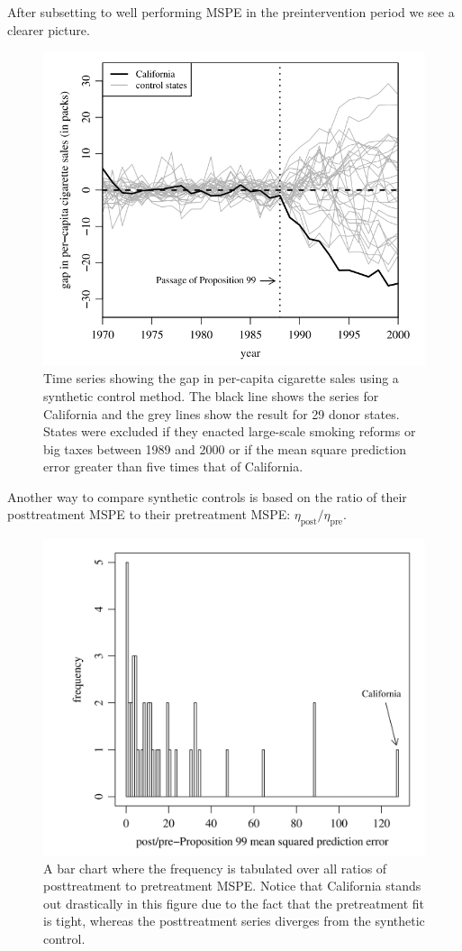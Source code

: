 \documentclass[notes,11pt, aspectratio=169]{beamer}
\begin{document}
\begin{frame}
    After subsetting to well performing MSPE in the preintervention period we see a clearer picture.
    \begin{figure}
        \centering
        \includegraphics[width = .5\linewidth]{figures/29donors.png}
        \captionsetup{font = tiny}
        \caption*{\tiny Time series showing the gap in per-capita cigarette sales using a synthetic control method. The black
        line shows the series for California and the grey lines show the result for 29 donor states. States were
        excluded if they enacted large-scale smoking reforms or big taxes between 1989 and 2000 or if the mean square prediction error
        greater than five times that of California.}    
        \end{figure}
\end{frame}

\begin{frame}{}
    \medskip 
    Another way to compare synthetic controls is based on the ratio of their posttreatment
    MSPE to their pretreatment MSPE: $\eta _{\text{post}} / \eta _{\text{pre}}$.
    \pause 

    \begin{figure}
        \centering
        \includegraphics[width = .5\linewidth]{figures/ratio.png}
        \captionsetup{font = tiny}
        \caption*{\tiny A bar chart where the frequency is tabulated over all ratios of posttreatment to pretreatment MSPE. Notice that California stands out drastically in this figure due to the fact that the pretreatment fit is tight, whereas the posttreatment series diverges from the synthetic control.}
    \end{figure}
    
\end{frame}
\end{document}
